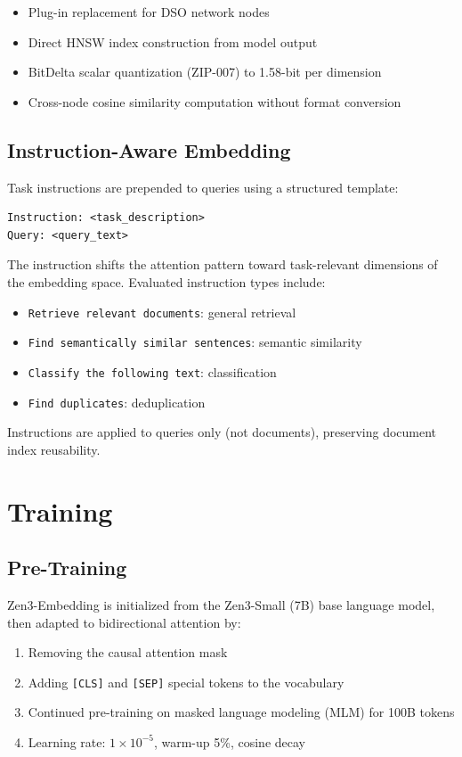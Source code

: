 \documentclass[11pt,a4paper]{article}
\begin{document}
\begin{itemize}
\item Plug-in replacement for DSO network nodes
\item Direct HNSW index construction from model output
\item BitDelta scalar quantization (ZIP-007) to 1.58-bit per dimension
\item Cross-node cosine similarity computation without format conversion
\end{itemize}

\subsection{Instruction-Aware Embedding}

Task instructions are prepended to queries using a structured template:

\begin{verbatim}
Instruction: <task_description>
Query: <query_text>
\end{verbatim}

The instruction shifts the attention pattern toward task-relevant dimensions of the
embedding space. Evaluated instruction types include:
\begin{itemize}
\item \texttt{Retrieve relevant documents}: general retrieval
\item \texttt{Find semantically similar sentences}: semantic similarity
\item \texttt{Classify the following text}: classification
\item \texttt{Find duplicates}: deduplication
\end{itemize}

Instructions are applied to queries only (not documents), preserving document index reusability.

\section{Training}
\label{sec:training}

\subsection{Pre-Training}

Zen3-Embedding is initialized from the Zen3-Small (7B) base language model, then
adapted to bidirectional attention by:
\begin{enumerate}
\item Removing the causal attention mask
\item Adding \texttt{[CLS]} and \texttt{[SEP]} special tokens to the vocabulary
\item Continued pre-training on masked language modeling (MLM) for 100B tokens
\item Learning rate: $1 \times 10^{-5}$, warm-up 5\%, cosine decay
\end{enumerate}
\end{document}
